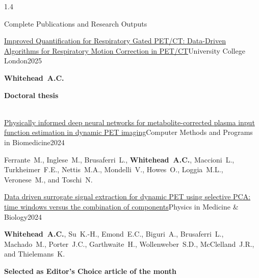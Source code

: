 \documentclass{cv}
\begin{document}
\begin{spacing}{1.4}
\begin{rSection}{Complete Publications and Research Outputs}
            \vspace{-0.5cm}
            \item \begin{rSubsection}{\href{https://discovery.ucl.ac.uk/id/eprint/10212970/}{Improved Quantification for Respiratory Gated PET/CT: Data-Driven Algorithms for Respiratory Motion Correction in PET/CT}}{}{University College London}{2025}
                \vspace{-0.25cm}
                \item \textbf{Whitehead~A.C.} \\
                \vspace{-0.5cm}
                \item \textbf{Doctoral thesis} \\
                \\
            \end{rSubsection}
            
            \vspace{-0.5cm}
            \item \begin{rSubsection}{\href{https://doi.org/10.1016/j.cmpb.2024.108375}{Physically informed deep neural networks for metabolite-corrected plasma input function estimation in dynamic PET imaging}}{}{Computer Methods and Programs in Biomedicine}{2024}
                \vspace{-0.25cm}
                \item Ferrante~M., Inglese~M., Brusaferri~L., \textbf{Whitehead~A.C.}, Maccioni~L., Turkheimer~F.E., Nettis~M.A., Mondelli~V., Howes~O., Loggia~M.L., Veronese~M., and Toschi~N.
                \\
            \end{rSubsection}
    
            \vspace{-0.5cm}
            \item \begin{rSubsection}{\href{https://doi.org/10.1088/1361-6560/ad5ef1}{Data driven surrogate signal extraction for dynamic PET using selective PCA: time windows versus the combination of components}}{}{Physics in Medicine \& Biology}{2024}
                \vspace{-0.25cm}
                \item \textbf{Whitehead~A.C.}, Su~K.-H., Emond~E.C., Biguri~A., Brusaferri~L., Machado~M., Porter~J.C., Garthwaite~H., Wollenweber~S.D., McClelland~J.R., and Thielemans~K. \\
                \vspace{-0.5cm}
                \item \textbf{Selected as Editor’s Choice article of the month} \\
                \\
            \end{rSubsection}
    

\end{rSection}
\end{spacing}
\end{document}
